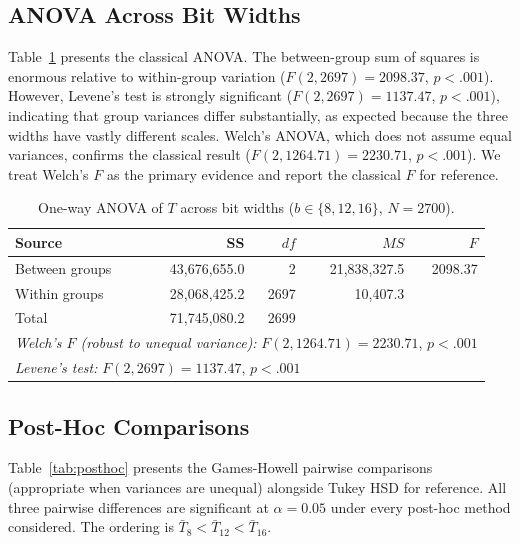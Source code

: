 \documentclass[12pt,letterpaper]{article}
\begin{document}
\subsection{ANOVA Across Bit Widths}

Table~\ref{tab:anova} presents the classical ANOVA. The between-group sum of squares is enormous relative to within-group variation ($F(2, 2697) = 2098.37$, $p < .001$). However, Levene's test is strongly significant ($F(2, 2697) = 1137.47$, $p < .001$), indicating that group variances differ substantially, as expected because the three widths have vastly different scales. Welch's ANOVA, which does not assume equal variances, confirms the classical result ($F(2, 1264.71) = 2230.71$, $p < .001$). We treat Welch's $F$ as the primary evidence and report the classical $F$ for reference.

\begin{table}[h]
\centering
\caption{One-way ANOVA of $T$ across bit widths ($b \in \{8, 12, 16\}$, $N = 2700$).}
\label{tab:anova}
\begin{tabular}{lrrrr}
\toprule
Source & SS & $df$ & $MS$ & $F$ \\
\midrule
Between groups        & 43{,}676{,}655.0  & 2     & 21{,}838{,}327.5 & 2098.37 \\
Within groups         & 28{,}068{,}425.2  & 2697  & 10{,}407.3        & \\
\midrule
Total                 & 71{,}745{,}080.2  & 2699  &                    & \\
\midrule
\multicolumn{5}{l}{\emph{Welch's $F$ (robust to unequal variance):} $F(2, 1264.71) = 2230.71$, $p < .001$} \\
\multicolumn{5}{l}{\emph{Levene's test:} $F(2, 2697) = 1137.47$, $p < .001$} \\
\bottomrule
\end{tabular}
\end{table}

\subsection{Post-Hoc Comparisons}

Table~\ref{tab:posthoc} presents the Games-Howell pairwise comparisons (appropriate when variances are unequal) alongside Tukey HSD for reference. All three pairwise differences are significant at $\alpha = 0.05$ under every post-hoc method considered. The ordering is $\bar{T}_{8} < \bar{T}_{12} < \bar{T}_{16}$.
\end{document}
